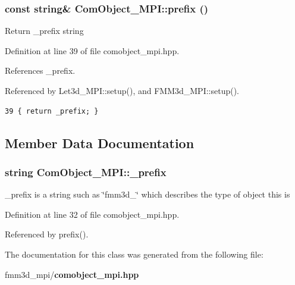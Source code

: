 \subsubsection{\setlength{\rightskip}{0pt plus 5cm}const string\& Com\-Object\_\-MPI::prefix ()\hspace{0.3cm}{\tt  [inline]}}\label{classComObject__MPI_8171d0694121d77c4bfba18e5745faa9_8171d0694121d77c4bfba18e5745faa9}


Return \_\-prefix string 

Definition at line 39 of file comobject\_\-mpi.hpp.

References \_\-prefix.

Referenced by Let3d\_\-MPI::setup(), and FMM3d\_\-MPI::setup().

\footnotesize\begin{verbatim}39 { return _prefix; }
\end{verbatim}\normalsize 




\subsection{Member Data Documentation}
\subsubsection{\setlength{\rightskip}{0pt plus 5cm}string {\bf Com\-Object\_\-MPI::\_\-prefix}\hspace{0.3cm}{\tt  [protected]}}\label{classComObject__MPI_b933f996cea3f524cf1514eb8539edfa_b933f996cea3f524cf1514eb8539edfa}


\_\-prefix is a string such as \char`\"{}fmm3d\_\-\char`\"{} which describes the type of object this is 

Definition at line 32 of file comobject\_\-mpi.hpp.

Referenced by prefix().

The documentation for this class was generated from the following file:\begin{CompactItemize}
\item 
fmm3d\_\-mpi/{\bf comobject\_\-mpi.hpp}\end{CompactItemize}
